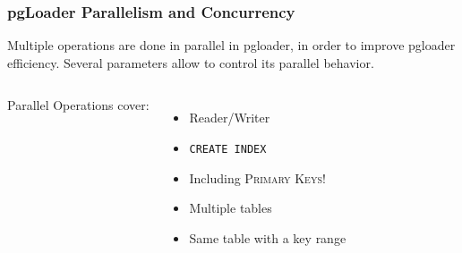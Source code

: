 \documentclass[xcolor=dvipsnames]{beamer}
\begin{document}
{

  \begin{frame}[fragile]
    \frametitle{pgLoader Parallelism and Concurrency}

    Multiple operations are done in parallel in pgloader, in order to
    improve pgloader efficiency. Several parameters allow to control its
    parallel behavior.

    \vfill
    
    \begin{columns}[c]
      Parallel Operations cover:
      \begin{itemize}
      \item Reader/Writer
      \item \texttt{CREATE INDEX}
      \item Including \textsc{Primary Keys!}
      \item Multiple tables
      \item Same table with a key range
      \end{itemize}

    \end{columns}  
  \end{frame}
}
\end{document}
